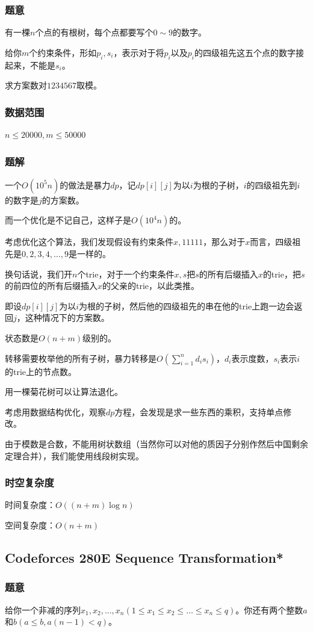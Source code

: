 \documentclass{ctexart}
\begin{document}
\subsubsection{题意}
有一棵$n$个点的有根树，每个点都要写个$0 \sim 9$的数字。

给你$m$个约束条件，形如$p_i,s_i$，表示对于将$p_i$以及$p_i$的四级祖先这五个点的数字接起来，不能是$s_i$。

求方案数对$1234567$取模。
\subsubsection{数据范围}
$n \le 20000,m \le 50000$
\subsubsection{题解}
一个$O(10^5 n)$的做法是暴力$dp$，记$dp[i][j]$为以$i$为根的子树，$i$的四级祖先到$i$的数字是$j$的方案数。

而一个优化是不记自己，这样子是$O(10^4 n)$的。

考虑优化这个算法，我们发现假设有约束条件$x,11111$，那么对于$x$而言，四级祖先是$0,2,3,4,\ldots,9$是一样的。

换句话说，我们开$n$个trie，对于一个约束条件$x,s$把$s$的所有后缀插入$x$的trie，把$s$的前四位的所有后缀插入$x$的父亲的trie，以此类推。

即设$dp[i][j]$为以$i$为根的子树，然后他的四级祖先的串在他的trie上跑一边会返回$j$，这种情况下的方案数。

状态数是$O(n+m)$级别的。

转移需要枚举他的所有子树，暴力转移是$O(\sum\limits_{i=1}^n d_is_i)$，$d_i$表示度数，$s_i$表示$i$的trie上的节点数。

用一棵菊花树可以让算法退化。

考虑用数据结构优化，观察$dp$方程，会发现是求一些东西的乘积，支持单点修改。

由于模数是合数，不能用树状数组（当然你可以对他的质因子分别作然后中国剩余定理合并），我们能使用线段树实现。
\subsubsection{时空复杂度}
时间复杂度：$O((n+m)\log n)$

空间复杂度：$O(n+m)$
\subsection{Codeforces 280E Sequence Transformation*}
\subsubsection{题意}
给你一个非减的序列$x_1,x_2,\ldots,x_n(1 \le x_1 \le x_2 \le \ldots \le x_n \le q)$。你还有两个整数$a$和$b(a \le b,a(n-1)<q)$。
\end{document}
